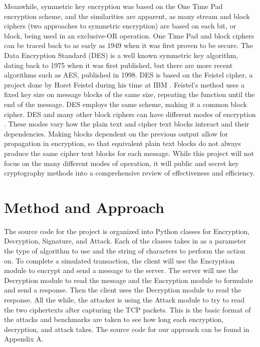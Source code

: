 \documentclass[12pt]{report}
\begin{document}
Meanwhile, symmetric key encryption was based on the One Time Pad encryption scheme, and the similarities are apparent, as many stream and block ciphers (two
approaches to symmetric encryption) are based on each bit, or block, being used in an exclusive-OR operation. One Time Pad and block ciphers can be traced back
to as early as 1949 when it was first proven to be secure. The Data Encryption Standard (DES) is a well known symmetric key algorithm, dating back to 1975 when
it was first published, but there are more recent algorithms such as AES, published in 1998. DES is based on the Feistel cipher, a project done by Horst Feistel
during his time at IBM \cite{feistel}. Feistel's method uses a fixed key size on message blocks of the same size, repeating the function until the end of the
message. DES employs the same scheme, making it a common block cipher. DES and many other block ciphers can have different modes of encryption \cite{modes}. These
modes vary how the plain text and cipher text blocks interact and their dependencies. Making blocks dependent on the previous output allow for propagation in
encryption, so that equivalent plain text blocks do not always produce the same cipher text blocks for each message. While this project will not focus on the many
different modes of operation, it will public and secret key cryptography methods into a comprehensive review of effectiveness and efficiency.


\section{Method and Approach}
The source code for the project is organized into Python classes for Encryption, Decryption, Signature, and Attack. Each of the classes takes in as a parameter the
type of algorithm to use and the string of characters to perform the action on. To complete a simulated transaction, the client will use the Encryption module to
encrypt and send a message to the server. The server will use the Decryption module to read the message and the Encryption module to formulate and send a response.
Then the client uses the Decryption module to read the response. All the while, the attacker is using the Attack module to try to read the two ciphertexts after
capturing the TCP packets. This is the basic format of the attacks and benchmarks are taken to see how long each encryption, decryption, and attack takes. The source
code for our approach can be found in Appendix A.
\end{document}
